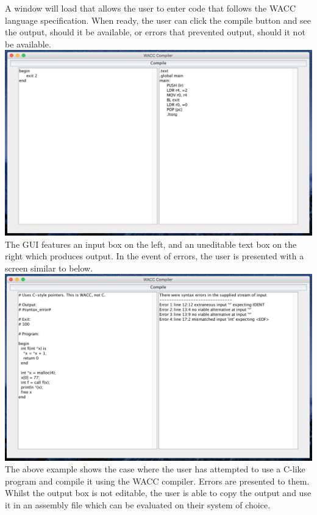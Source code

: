 \documentclass[a4paper, 11pt]{article} %
\begin{document}
A window will load that allows the user to enter code that follows the WACC language specification. When ready, the user can click the compile button and see the output, should it be available, or errors that prevented output, should it not be available. \\

\includegraphics[scale=0.32]{sample-exit2.png} \\

The GUI features an input box on the left, and an uneditable text box on the right which produces output. In the event of errors, the user is presented with a screen similar to below. \\

\includegraphics[scale=0.32]{sample-invalid1.png} \\

The above example shows the case where the user has attempted to use a C-like program and compile it using the WACC compiler. Errors are presented to them. \\

Whilst the output box is not editable, the user is able to copy the output and use it in an assembly file which can be evaluated on their system of choice.

\end{document}
